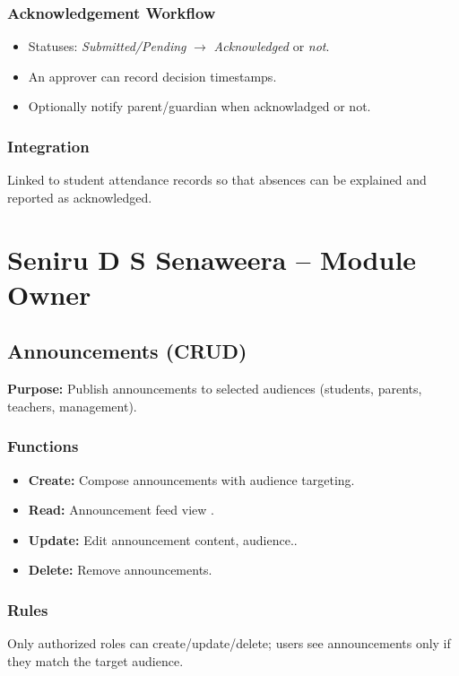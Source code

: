 \documentclass[12pt,a4paper]{article}
\begin{document}
\subsubsection*{Acknowledgement Workflow}
\begin{itemize}[leftmargin=*]
  \item Statuses: \textit{Submitted/Pending} $\rightarrow$ \textit{Acknowledged} or \textit{not}.
  \item An approver can record decision timestamps.
  \item Optionally notify parent/guardian when acknowladged or not.
\end{itemize}

\subsubsection*{Integration}
Linked to student attendance records so that absences can be explained and reported as acknowledged.

\section{Seniru D S Senaweera -- Module Owner}

\subsection{Announcements (CRUD)}
\textbf{Purpose:} Publish announcements to selected audiences (students, parents, teachers, management).

\subsubsection*{Functions}
\begin{itemize}[leftmargin=*]
  \item \textbf{Create:} Compose  announcements with audience targeting.
  \item \textbf{Read:} Announcement feed view .
  \item \textbf{Update:} Edit announcement content, audience..
  \item \textbf{Delete:} Remove announcements.
\end{itemize}

\subsubsection*{Rules}
Only authorized roles can create/update/delete; users see announcements only if they match the target audience.
\end{document}
